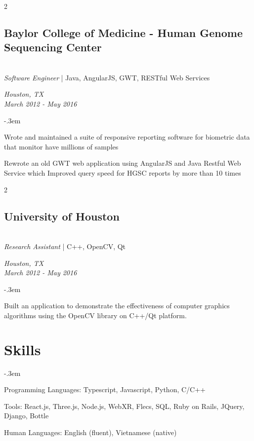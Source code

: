 \documentclass{article}
\let\olditemize=\itemize \let\endolditemize=\enditemize
\renewenvironment{itemize}{\olditemize[topsep=0em] \itemsep-.3em}{\endolditemize}
\newenvironment{twocolentry}[2][]{
    \def\secondColumn{#2}
    \raggedright
    \setcolumnwidth{\fill, 6cm}
    \begin{paracol}{2}
}{
    \switchcolumn \raggedleft \secondColumn
    \end{paracol}
} %
\begin{document}
\newpage
\begin{twocolentry}{
  \textit{Houston, TX} \\
  \textit{March 2012 - May 2016} \\
}
\subsection{Baylor College of Medicine - Human Genome Sequencing Center}\hfill\\
\textit{Software Engineer} | Java, AngularJS, GWT, RESTful Web Services
\end{twocolentry}
\begin{itemize}
  \item Wrote and maintained a suite of responsive reporting software for biometric data that
  monitor have millions of samples
  \item Rewrote an old GWT web application using AngularJS and Java Restful Web Service which
  Improved query speed for HGSC reports by more than 10 times
\end{itemize}

\begin{twocolentry}{
  \textit{Houston, TX} \\
  \textit{March 2012 - May 2016} \\
}
\subsection{University of Houston}\hfill\\
\textit{Research Assistant} | C++, OpenCV, Qt
\end{twocolentry}
\begin{itemize}
  \item Built an application to demonstrate the effectiveness of computer graphics algorithms using
  the OpenCV library on C++/Qt platform.
\end{itemize}


\section{Skills}
\begin{itemize}
\item Programming Languages: Typescript, Javascript, Python, C/C++
\item Tools: React.js, Three.js, Node.js, WebXR, Flecs, SQL, Ruby on Rails, JQuery, Django, Bottle
\item Human Languages: English (fluent), Vietnamese (native)
\end{itemize}
\end{document}

